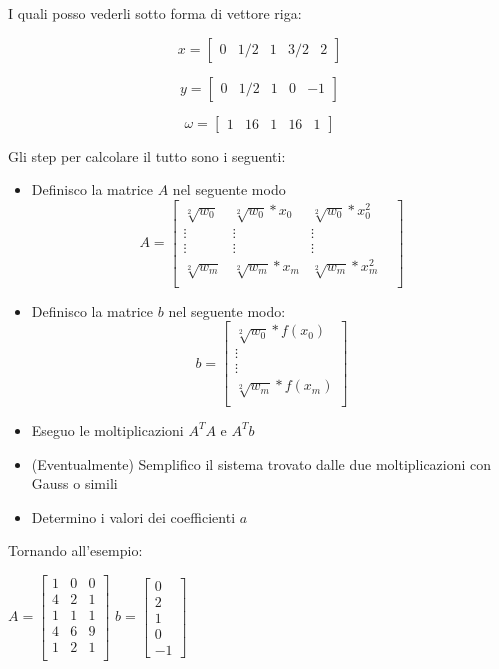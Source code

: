 I quali posso vederli sotto forma di vettore riga:

$$x = 
\begin{bmatrix}
0 & 1/2 & 1 & 3/2 & 2
\end{bmatrix}
$$

$$y = 
\begin{bmatrix}
0 & 1/2 & 1 & 0 & -1
\end{bmatrix}
$$

$$\omega = 
\begin{bmatrix}
1 & 16 & 1 & 16 & 1
\end{bmatrix}
$$

Gli step per calcolare il tutto sono i seguenti:
\begin{itemize}
\item Definisco la matrice $A$ nel seguente modo
$$ A =
\begin{bmatrix}
\sqrt[2]{w_0} & \sqrt[2]{w_0}*x_0 & \sqrt[2]{w_0}*x^2_0 &\\
\vdots & \vdots & \vdots \\
\vdots  & \vdots & \vdots & \\
\sqrt[2]{w_m} & \sqrt[2]{w_m}*x_m & \sqrt[2]{w_m}*x^2_m & \\
\end{bmatrix}
$$
\item Definisco la matrice $b$ nel seguente modo:
$$ b =
\begin{bmatrix}
\sqrt[2]{w_0}*f(x_0) \\
\vdots \\
\vdots  \\
\sqrt[2]{w_m}*f(x_m) \\
\end{bmatrix}
$$
\item Eseguo le moltiplicazioni $A^TA$ e $A^Tb$
\item (Eventualmente) Semplifico il sistema trovato dalle due moltiplicazioni con Gauss o simili
\item Determino i valori dei coefficienti $a$
\end{itemize}
\noindent
Tornando all'esempio: \\ 
\begin{center}

$ A = \begin{bmatrix}
1 & 0 & 0 \\
4 & 2 & 1 \\
1 & 1 & 1 \\
4 & 6 & 9 \\
1 & 2 & 1 \\
\end{bmatrix}
$
\hbox{}
$ b = \begin{bmatrix}
0 \\ 2 \\ 1 \\ 0 \\ -1
\end{bmatrix}
$
\end{center}
